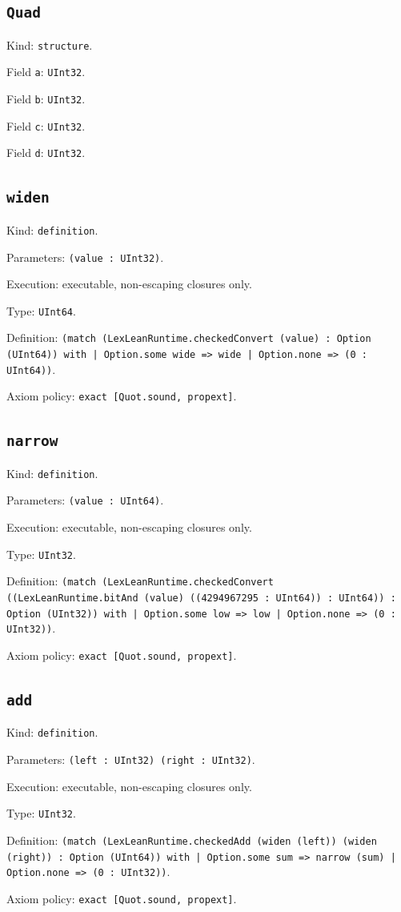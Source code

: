 \documentclass[11pt]{article}
\begin{document}
\subsection*{\texttt{Quad}}
\noindent Kind: \texttt{structure}.\par
\noindent Field \texttt{a}: \texttt{UInt32}.\par
\noindent Field \texttt{b}: \texttt{UInt32}.\par
\noindent Field \texttt{c}: \texttt{UInt32}.\par
\noindent Field \texttt{d}: \texttt{UInt32}.\par
\subsection*{\texttt{widen}}
\noindent Kind: \texttt{definition}.\par
\noindent Parameters: \texttt{(value : UInt32)}.\par
\noindent Execution: executable, non-escaping closures only.\par
\noindent Type: \texttt{UInt64}.\par
\noindent Definition: \texttt{(match (LexLeanRuntime.checkedConvert (value) : Option (UInt64)) with | Option.some wide => wide | Option.none => (0 : UInt64))}.\par
\noindent Axiom policy: \texttt{exact [Quot.sound, propext]}.\par
\subsection*{\texttt{narrow}}
\noindent Kind: \texttt{definition}.\par
\noindent Parameters: \texttt{(value : UInt64)}.\par
\noindent Execution: executable, non-escaping closures only.\par
\noindent Type: \texttt{UInt32}.\par
\noindent Definition: \texttt{(match (LexLeanRuntime.checkedConvert ((LexLeanRuntime.bitAnd (value) ((4294967295 : UInt64)) : UInt64)) : Option (UInt32)) with | Option.some low => low | Option.none => (0 : UInt32))}.\par
\noindent Axiom policy: \texttt{exact [Quot.sound, propext]}.\par
\subsection*{\texttt{add}}
\noindent Kind: \texttt{definition}.\par
\noindent Parameters: \texttt{(left : UInt32) (right : UInt32)}.\par
\noindent Execution: executable, non-escaping closures only.\par
\noindent Type: \texttt{UInt32}.\par
\noindent Definition: \texttt{(match (LexLeanRuntime.checkedAdd (widen (left)) (widen (right)) : Option (UInt64)) with | Option.some sum => narrow (sum) | Option.none => (0 : UInt32))}.\par
\noindent Axiom policy: \texttt{exact [Quot.sound, propext]}.\par
\end{document}
